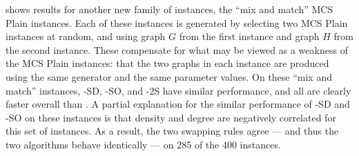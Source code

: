  shows results for another new family of instances,
the ``mix and match'' MCS Plain instances.  Each of these instances is generated by selecting two
MCS Plain instances at random, and using graph $G$ from the first instance and graph $H$ from the second
instance.  These compensate for what may be viewed as a weakness of the MCS Plain instances: that
the two graphs in each instance are produced using the same generator and the same parameter values.
On these ``mix and match'' instances, \McSplit-SD, \McSplit-SO, and \McSplit-2S have similar performance, and
all are clearly faster overall than \McSplit.  A partial explanation for the similar performance
of \McSplit-SD and \McSplit-SO on these instances is that density and degree are negatively correlated
for this set of instances.  As a result, the two swapping rules agree --- and thus the two
algorithms behave identically --- on 285 of the 400 instances.


